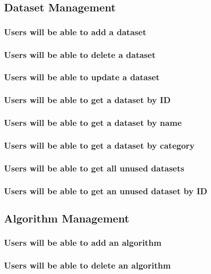 \subsection{Dataset Management}

\subsubsection {Users will be able to add a dataset}
\subsubsection {Users will be able to delete a dataset}
\subsubsection {Users will be able to update a dataset}
\subsubsection {Users will be able to get a dataset by ID}
\subsubsection {Users will be able to get a dataset by name}
\subsubsection {Users will be able to get a dataset by category}
\subsubsection {Users will be able to get all unused datasets}
\subsubsection {Users will be able to get an unused dataset by ID}

\subsection{Algorithm Management}

\subsubsection {Users will be able to add an algorithm}
\subsubsection {Users will be able to delete an algorithm}
